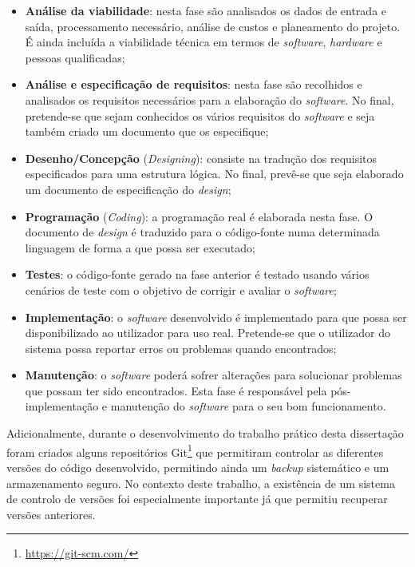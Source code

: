 \begin{itemize}
	\item \textbf{Análise da viabilidade}: nesta fase são analisados os dados de entrada e saída, processamento necessário, análise de custos e planeamento do projeto. É ainda incluída a viabilidade técnica em termos de \textit{software}, \textit{hardware} e pessoas qualificadas;
	
	\item \textbf{Análise e especificação de requisitos}: nesta fase são recolhidos e analisados os requisitos necessários para a elaboração do \textit{software}. No final, pretende-se que sejam conhecidos os vários requisitos do \textit{software} e seja também criado um documento que os especifique; 
	
	\item  \textbf{Desenho/Concepção} (\textit{Designing}): consiste na tradução dos requisitos especificados para uma estrutura lógica. No final, prevê-se que seja elaborado um documento de especificação do \textit{design}; 
	
	
	\item  \textbf{Programação} (\textit{Coding}): a programação real é elaborada nesta fase. O documento de \textit{design} é traduzido para o código-fonte numa determinada linguagem de forma a que possa ser executado;
	
	\item \textbf{Testes}: o código-fonte gerado na fase anterior é testado usando vários cenários de teste com o objetivo de corrigir e avaliar o \textit{software}; 
	
	\item  \textbf{Implementação}: o \textit{software} desenvolvido é implementado para que possa ser disponibilizado ao utilizador para uso real. Pretende-se que o utilizador do sistema possa reportar erros ou problemas quando encontrados; 
	
	\item  \textbf{Manutenção}: o \textit{software} poderá sofrer alterações para solucionar problemas que possam ter sido encontrados. Esta fase é responsável pela pós-implementação e manutenção do \textit{software} para o seu bom funcionamento.
	
\end{itemize}


Adicionalmente, durante o desenvolvimento do trabalho prático desta dissertação foram criados alguns repositórios Git\footnote{\url{https://git-scm.com/}} que permitiram controlar as diferentes versões do código desenvolvido, permitindo ainda um \textit{backup} sistemático e um armazenamento seguro. No contexto deste trabalho, a existência de um sistema de controlo de versões foi especialmente importante já que permitiu recuperar versões anteriores. 


